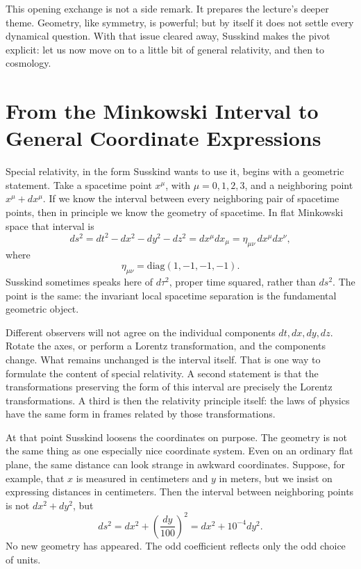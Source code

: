 This opening exchange is not a side remark. It prepares the lecture's deeper theme. Geometry, like symmetry, is powerful; but by itself it does not settle every dynamical question. With that issue cleared away, Susskind makes the pivot explicit: let us now move on to a little bit of general relativity, and then to cosmology.

\section{From the Minkowski Interval to General Coordinate Expressions}

Special relativity, in the form Susskind wants to use it, begins with a geometric statement. Take a spacetime point \(x^\mu\), with \(\mu=0,1,2,3\), and a neighboring point \(x^\mu+dx^\mu\). If we know the interval between every neighboring pair of spacetime points, then in principle we know the geometry of spacetime. In flat Minkowski space that interval is
\begin{equation}
ds^2 = dt^2 - dx^2 - dy^2 - dz^2
      = dx^\mu dx_\mu
      = \eta_{\mu\nu}\,dx^\mu dx^\nu,
\end{equation}
where
\begin{equation}
\eta_{\mu\nu}=\mathrm{diag}(1,-1,-1,-1).
\end{equation}
Susskind sometimes speaks here of \(d\tau^2\), proper time squared, rather than \(ds^2\). The point is the same: the invariant local spacetime separation is the fundamental geometric object.

Different observers will not agree on the individual components \(dt,dx,dy,dz\). Rotate the axes, or perform a Lorentz transformation, and the components change. What remains unchanged is the interval itself. That is one way to formulate the content of special relativity. A second statement is that the transformations preserving the form of this interval are precisely the Lorentz transformations. A third is then the relativity principle itself: the laws of physics have the same form in frames related by those transformations.

At that point Susskind loosens the coordinates on purpose. The geometry is not the same thing as one especially nice coordinate system. Even on an ordinary flat plane, the same distance can look strange in awkward coordinates. Suppose, for example, that \(x\) is measured in centimeters and \(y\) in meters, but we insist on expressing distances in centimeters. Then the interval between neighboring points is not \(dx^2+dy^2\), but
\begin{equation}
ds^2 = dx^2 + \left(\frac{dy}{100}\right)^2
     = dx^2 + 10^{-4}dy^2.
\end{equation}
No new geometry has appeared. The odd coefficient reflects only the odd choice of units.

